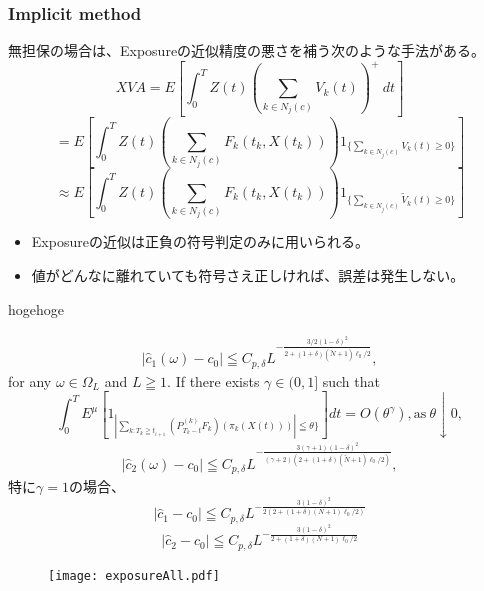 \documentclass[driverfallback=dvipdfmx,cjk]{beamer}
\begin{document}
\begin{frame}\frametitle{Implicit method}
無担保の場合は、Exposureの近似精度の悪さを補う次のような手法がある。
$$ XVA = E\left[\int_0^T Z(t)\left(\sum_{k \in N_j(c)}V_k(t)\right)^+ \ dt\right] $$
$$ = E\left[ \int_0^T Z(t) \left(\sum_{k \in N_j(c)} F_k(t_k, X(t_k)) \right) 1_{\{\sum_{k \in N_j(c)} V_k(t) \ge 0 \}} \right] $$
$$\approx E\left[ \int_0^T Z(t) \left(\sum_{k \in N_j(c)} F_k(t_k, X(t_k)) \right) 1_{\{\sum_{k \in N_j(c)} \tilde{V}_k(t) \ge 0 \}} \right] $$
\begin{itemize}
    \item Exposureの近似は正負の符号判定のみに用いられる。
    \item 値がどんなに離れていても符号さえ正しければ、誤差は発生しない。
\end{itemize}
\end{frame}

\begin{frame}
    \begin{Theorem}
       hogehoge 
    \end{Theorem}
    
\end{frame}

\begin{frame}
    \begin{align*}
    |\hat{c}_1(\omega)-c_0| \leqq C_{p,\delta}L^{-\frac{3/2(1-\delta)^2}{2+(1+\delta)(\tilde{N}+1)\ell_0/2}},
    \end{align*}
    for any $\omega \in \Omega_{L}$ and $L \geqq 1$.
    If there exists $\gamma \in (0,1]$ such that
$$\int_0^T E^{\mu}[ 1_{| \sum_{k:T_k\geqq t_{i+1}} (P_{T_k-t}^{(k)}F_k)(\pi_k (X(t)))| \leqq \theta\} } ]dt =O(\theta^{\gamma}), \text{as} \ \theta \downarrow 0,$$
 \begin{align*}
 |\hat{c}_2(\omega)-c_0| \leqq C_{p,\delta}L^{-\frac{3(\gamma+1)(1-\delta)^2}{(\gamma+2)(2+(1+\delta)(\tilde{N}+1)\ell_0/2)}},
 \end{align*}
特に$\gamma = 1$の場合、
$$|\hat{c}_1 - c_0| \leqq C_{p,\delta}L^{-\frac{3(1-\delta)^2}{2(2+(1+\delta)(N+1)\ell_0/2)}}$$ 
$$|\hat{c}_2 - c_0| \leqq C_{p,\delta}L^{-\frac{3(1-\delta)^2}{2+(1+\delta)(N+1)\ell_0/2}}$$ 
\end{frame}

\begin{frame}
    \begin{figure}
        \texttt{[image: exposureAll.pdf]}
    \end{figure}
\end{frame}
\end{document}
